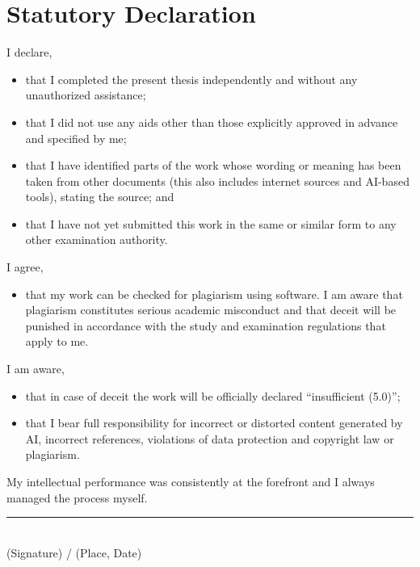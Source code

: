 \documentclass[12pt,a4paper]{article}
\begin{document}
\newpage
\section*{Statutory Declaration}
I declare,
\begin{itemize}
  \item that I completed the present thesis independently and without any unauthorized assistance;
  \item that I did not use any aids other than those explicitly approved in advance and specified by me;
  \item that I have identified parts of the work whose wording or meaning has been taken from other documents (this also includes internet sources and AI-based tools), stating the source; and
  \item that I have not yet submitted this work in the same or similar form to any other examination authority.
\end{itemize}
I agree,
\begin{itemize}
  \item that my work can be checked for plagiarism using software. I am aware that plagiarism constitutes serious academic misconduct and that deceit will be punished in accordance with the study and examination regulations that apply to me.
\end{itemize}
I am aware,
\begin{itemize}
  \item that in case of deceit the work will be officially declared ``insufficient (5.0)'';
  \item that I bear full responsibility for incorrect or distorted content generated by AI, incorrect references, violations of data protection and copyright law or plagiarism.
\end{itemize}
My intellectual performance was consistently at the forefront and I always managed the process myself.

\vspace{2.5cm}
\noindent\rule{7cm}{0.4pt}\\
(Signature) / (Place, Date)
\end{document}
